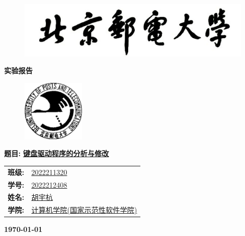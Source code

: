 \documentclass[UTF8, 12pt, a4paper, oneside]{ctexart}
\begin{document}
	\sloppy
	\thispagestyle{empty}
    \begin{figure}[t]
		\centering
		\includegraphics[width=13cm]{logo1.jpg}
	\end{figure}

    \begin{center}
        \Huge\textbf{实验报告}
    \end{center}
	\vspace*{1em}
    \begin{figure}[htbp]
		\centering
		\includegraphics[width=3cm]{logo2.jpg}
	\end{figure}
	\begin{center}
		\Huge\textbf{题目:} \underline{\textbf{键盘驱动程序的分析与修改}} 
	\end{center}
    \vspace*{5em}
	\begin{table}[htbp]
		\centering
		\large
		\begin{tabular}{ll}
        \textbf{班级:} & \underline{2022211320} \\
		\textbf{学号:} & \underline{2022212408} \\
		\textbf{姓名:} & \underline{胡宇杭} \\
		\textbf{学院:} & \underline{计算机学院(国家示范性软件学院)} \\
		\end{tabular}
	\end{table}

    \vspace*{2em}

    \begin{center}
        \Huge\textbf{\today} 
    \end{center}

    \newpage
    \tableofcontents
    \newpage

    
    
    
    
    
    
\end{document}
